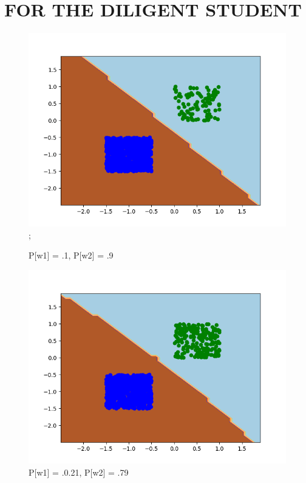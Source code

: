 \documentclass{article}
\begin{document}
\section{\MakeUppercase{For the diligent student}}
\begin{figure}[!htb]
	\begin{minipage}{0.24\textwidth}
		\centering
		\includegraphics[scale=0.24]{../changingpriors/this0.png};
	\caption{P[w1] = .1, P[w2] = .9}
	\end{minipage}
	\begin{minipage}{0.24\textwidth}
			\centering
			\includegraphics[scale=0.24]{../changingpriors/this4.png}
			\caption{P[w1] = .0.21, P[w2] = .79}
	\end{minipage}

\end{figure}
\end{document}
